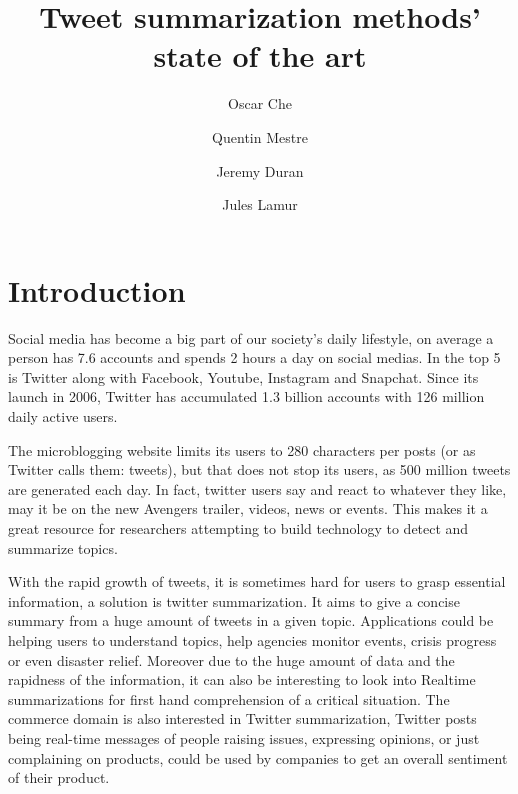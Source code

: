 \documentclass[runningheads]{llncs}
\begin{document}

\title{Tweet summarization methods' state of the art}

\author{Oscar Che \and
Quentin Mestre \and
Jeremy Duran \and
Jules Lamur \\
}


\maketitle

\section{Introduction}

Social media has become a big part of our society's daily lifestyle, on average
a person has 7.6 accounts and spends 2 hours a day on social medias. In the top
5 is Twitter along with Facebook, Youtube, Instagram and Snapchat. Since its
launch in 2006, Twitter has accumulated 1.3 billion accounts with 126 million
daily active users.

The microblogging website limits its users to 280 characters per posts (or as
Twitter calls them: tweets), but that does not stop its users, as 500 million
tweets are generated each day. In fact, twitter users say and react to whatever
they like, may it be on the new Avengers trailer, videos, news or events. This
makes it a great resource for researchers attempting to build technology to
detect and summarize topics.

With the rapid growth of tweets, it is sometimes hard for users to grasp
essential information, a solution is twitter summarization. It aims to give a
concise summary from a huge amount of tweets in a given topic. Applications
could be helping users to understand topics, help agencies monitor events,
crisis progress or even disaster relief. Moreover due to the huge amount of
data and the rapidness of the information, it can also be interesting to look
into Realtime summarizations for first hand comprehension of a critical
situation.  The commerce domain is also interested in Twitter summarization,
Twitter posts being real-time messages of people raising issues, expressing
opinions, or just complaining on products, could be used by companies to get an
overall sentiment of their product.
\end{document}
